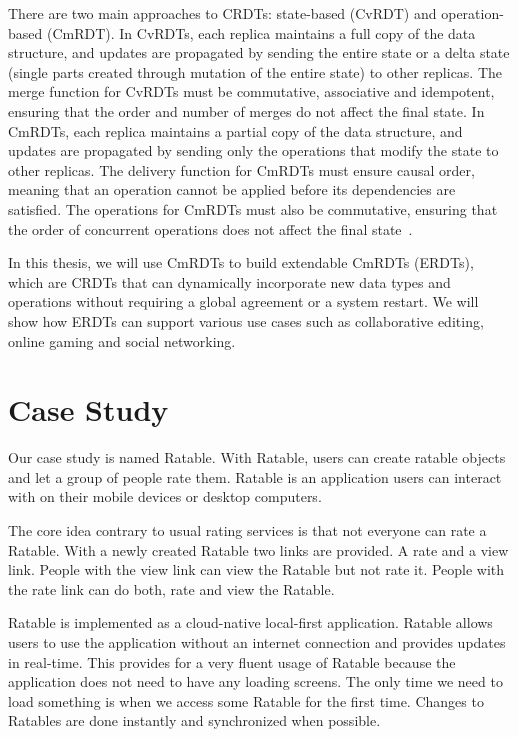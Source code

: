\documentclass[
	english,
	ruledheaders=section,   %
	class=report,		    %
	thesis={type=bachelor}, %
	accentcolor=9c,			%
	custommargins=true,    %
	marginpar=false,        %
	parskip=half-,          %
	fontsize=11pt,          %
]{tudapub}
\begin{document}
There are two main approaches to CRDTs: state-based (CvRDT) and operation-based (CmRDT). In CvRDTs, each replica maintains a full copy of the data structure, and updates are propagated by sending the entire state or a delta state (single parts created through mutation of the entire state) to other replicas. The merge function for CvRDTs must be commutative, associative and idempotent, ensuring that the order and number of merges do not affect the final state. In CmRDTs, each replica maintains a partial copy of the data structure, and updates are propagated by sending only the operations that modify the state to other replicas. The delivery function for CmRDTs must ensure causal order, meaning that an operation cannot be applied before its dependencies are satisfied. The operations for CmRDTs must also be commutative, ensuring that the order of concurrent operations does not affect the final state~\cite{Shapiro2011ConflictFreeRD}.

In this thesis, we will use CmRDTs to build extendable CmRDTs (ERDTs), which are CRDTs that can dynamically incorporate new data types and operations without requiring a global agreement or a system restart. We will show how ERDTs can support various use cases such as collaborative editing, online gaming and social networking.

\section{Case Study}
Our case study is named Ratable. With Ratable, users can create ratable objects and let a group of people rate them. Ratable is an application users can interact with on their mobile devices or desktop computers. 

The core idea contrary to usual rating services is that not everyone can rate a Ratable. With a newly created Ratable two links are provided. A rate and a view link. People with the view link can view the Ratable but not rate it. People with the rate link can do both, rate and view the Ratable. 

Ratable is implemented as a cloud-native local-first application. Ratable allows users to use the application without an internet connection and provides updates in real-time. This provides for a very fluent usage of Ratable because the application does not need to have any loading screens. The only time we need to load something is when we access some Ratable for the first time. Changes to Ratables are done instantly and synchronized when possible.
\end{document}
